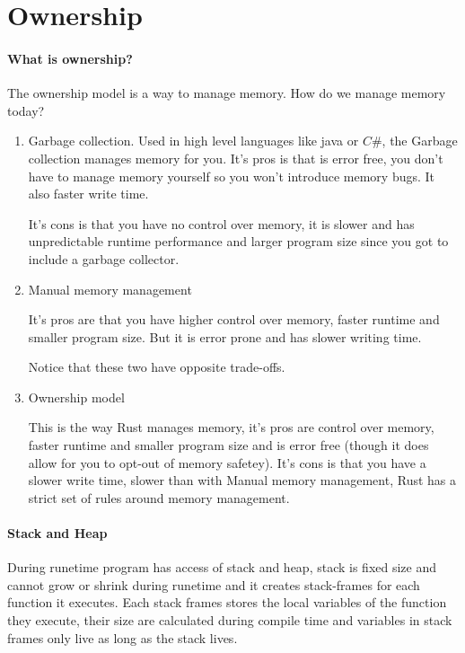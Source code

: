 \section{Ownership}
\paragraph*{What is ownership?}
The ownership model is a way to manage memory. How do we manage memory today?\begin{enumerate}
    \item Garbage collection.
Used in high level languages like java or $C\#$, the Garbage collection manages memory for you.
It's pros is that is error free, you don't have to manage memory yourself so you won't introduce memory bugs. It also faster write time.

It's cons is that you have no control over memory, it is slower and has unpredictable runtime performance and larger program size since you got to include a garbage collector.

    \item Manual memory management
    
It's pros are that you have higher control over memory, faster runtime and smaller program size. But it is error prone and has slower writing time.

Notice that these two have opposite trade-offs.

    \item Ownership model
    
This is the way Rust manages memory, it's pros are control over memory, faster runtime and smaller program size and is error free (though it does allow for you to opt-out of memory safetey).
It's cons is that you have a slower write time, slower than with Manual memory management, Rust has a strict set of rules around memory management.
\end{enumerate}

\paragraph*{Stack and Heap}
During runetime program has access of stack and heap, stack is fixed size and cannot grow or shrink during runetime and it creates stack-frames for each function 
it executes. Each stack frames stores the local variables of the function they execute, their size are calculated during compile time and variables in stack frames 
only live as long as the stack lives.

